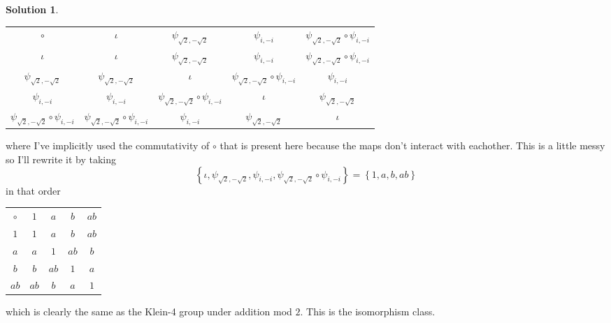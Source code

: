 \documentclass[10pt]{article}
\theoremstyle{definition}
\newtheorem{soln}{Solution}
\begin{document}
\begin{soln}
\begin{enumerate}[label=(\alph*)]
\begin{center}
            \begin{tabular}{c | c c c c}
              $\circ $                                     & $\iota$                                      & $\psi_{\sqrt{2},-\sqrt{2}}$                  & $\psi_{i,-i}$                                & $\psi_{\sqrt{2},-\sqrt{2}}\circ \psi_{i,-i}$ \\
              \cline{1-5}
              $\iota$                                      & $\iota$                                      & $\psi_{\sqrt{2},-\sqrt{2}}$                  & $\psi_{i,-i}$                                & $\psi_{\sqrt{2},-\sqrt{2}}\circ \psi_{i,-i}$ \\
              $\psi_{\sqrt{2},-\sqrt{2}}$                  & $\psi_{\sqrt{2},-\sqrt{2}}$                  & $\iota$                                      & $\psi_{\sqrt{2},-\sqrt{2}}\circ \psi_{i,-i}$ & $\psi_{i,-i}$                                \\
              $\psi_{i,-i}$                                & $\psi_{i,-i}$                                & $\psi_{\sqrt{2},-\sqrt{2}}\circ \psi_{i,-i}$ & $\iota$                                      & $\psi_{\sqrt{2},-\sqrt{2}}$                  \\
              $\psi_{\sqrt{2},-\sqrt{2}}\circ \psi_{i,-i}$ & $\psi_{\sqrt{2},-\sqrt{2}}\circ \psi_{i,-i}$ & $\psi_{i,-i}$                                & $\psi_{\sqrt{2},-\sqrt{2}}$                  & $\iota$
            \end{tabular}
          \end{center}
          where I've implicitly used the commutativity of $\circ$ that is present here because the maps don't interact with eachother.
          This is a little messy so I'll rewrite it by taking
          $$\left\{\iota, \psi_{\sqrt{2},-\sqrt{2}}, \psi_{i,-i}, \psi_{\sqrt{2},-\sqrt{2}}\circ \psi_{i,-i}\right\}=\left\{1, a, b, ab\right\}$$
          in that order
          \begin{center}
            \begin{tabular}{c | c c c c}
              $\circ $ & $1$  & $a$  & $b$  & $ab$ \\
              \cline{1-5}
              $1$      & $1$  & $a$  & $b$  & $ab$ \\
              $a$      & $a$  & $1$  & $ab$ & $b$  \\
              $b$      & $b$  & $ab$ & $1$  & $a$  \\
              $ab$     & $ab$ & $b$  & $a$  & $1$
            \end{tabular}
          \end{center}
          which is clearly the same as the Klein-4 group under addition mod $2$. This is the isomorphism class.
  \end{enumerate}
\end{soln}
\end{document}
